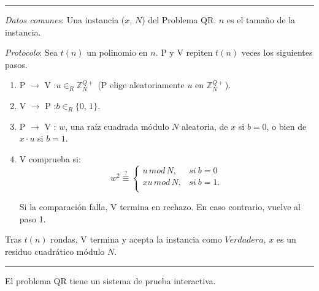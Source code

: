 \rule{\textwidth}{1pt}
\begin{algorithm}
	
	\hfil
	
	\textit{Datos comunes}: Una instancia ($x$, $N$) del Problema QR. $n$ es el tamaño de la instancia.
	
	\textit{Protocolo}: Sea $t(n)$ un polinomio en $n$. P y V repiten $t(n)$ veces los siguientes pasos.
	
	\begin{enumerate}
		
		\item P $\rightarrow$ V :\quad $u \in_R \mathbb{Z}^{Q+}_N$ \quad (P elige aleatoriamente $u$ en $\mathbb{Z}^{Q+}_N$).
		
		\item V $\rightarrow$ P :\quad $b \in_R \{0,\,1\}$.
		
		\item P $\rightarrow$ V :\; $w$,\; una raíz cuadrada módulo $N$ aleatoria, de $x$ si $b=0$, o bien de $x\cdot u$ si $b=1$.
		
		\item V comprueba si:
		\[
			w^2 \overset{?}{\equiv}
			\begin{cases}
				u\, mod\, N, & si\ b = 0\\
				xu\, mod\, N, & si\ b = 1.\\
			\end{cases}
		\]
		
		Si la comparación falla, V termina en rechazo. En caso contrario, vuelve al paso 1.
		
		
	\end{enumerate}

	Tras $t(n)$ rondas, V termina y acepta la instancia como $Verdadera$, $x$ es un residuo cuadrático módulo $N$.
	
	\label{QRinteractive:alg}
\end{algorithm}
\rule{\textwidth}{1pt}

\hfil


\begin{theorem}
	El problema QR tiene un sistema de prueba interactiva.
	\label{theo:QRint}
\end{theorem}

